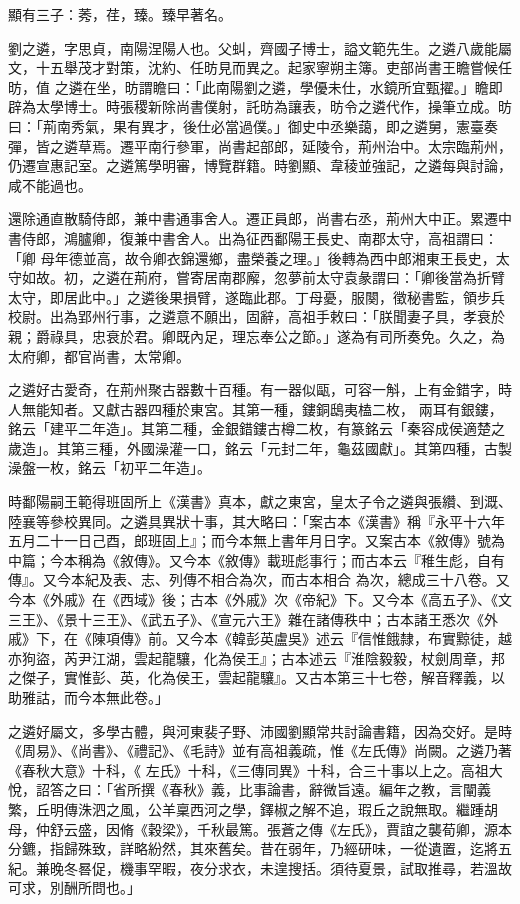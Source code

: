 \begin{pinyinscope}
 顯有三子：莠，荏，臻。臻早著名。



 劉之遴，字思貞，南陽涅陽人也。父虯，齊國子博士，謚文範先生。之遴八歲能屬文，十五舉茂才對策，沈約、任昉見而異之。起家寧朔主簿。吏部尚書王瞻嘗候任昉，值
 之遴在坐，昉謂瞻曰：「此南陽劉之遴，學優未仕，水鏡所宜甄擢。」瞻即辟為太學博士。時張稷新除尚書僕射，託昉為讓表，昉令之遴代作，操筆立成。昉曰：「荊南秀氣，果有異才，後仕必當過僕。」御史中丞樂藹，即之遴舅，憲臺奏彈，皆之遴草焉。遷平南行參軍，尚書起部郎，延陵令，荊州治中。太宗臨荊州，仍遷宣惠記室。之遴篤學明審，博覽群籍。時劉顯、韋稜並強記，之遴每與討論，咸不能過也。



 還除通直散騎侍郎，兼中書通事舍人。遷正員郎，尚書右丞，荊州大中正。累遷中書侍郎，鴻臚卿，復兼中書舍人。出為征西鄱陽王長史、南郡太守，高祖謂曰：「卿
 母年德並高，故令卿衣錦還鄉，盡榮養之理。」後轉為西中郎湘東王長史，太守如故。初，之遴在荊府，嘗寄居南郡廨，忽夢前太守袁彖謂曰：「卿後當為折臂太守，即居此中。」之遴後果損臂，遂臨此郡。丁母憂，服闋，徵秘書監，領步兵校尉。出為郢州行事，之遴意不願出，固辭，高祖手敕曰：「朕聞妻子具，孝衰於親；爵祿具，忠衰於君。卿既內足，理忘奉公之節。」遂為有司所奏免。久之，為太府卿，都官尚書，太常卿。



 之遴好古愛奇，在荊州聚古器數十百種。有一器似甌，可容一斛，上有金錯字，時人無能知者。又獻古器四種於東宮。其第一種，鏤銅鴟夷榼二枚，
 兩耳有銀鏤，銘云「建平二年造」。其第二種，金銀錯鏤古樽二枚，有篆銘云「秦容成侯適楚之歲造」。其第三種，外國澡灌一口，銘云「元封二年，龜茲國獻」。其第四種，古製澡盤一枚，銘云「初平二年造」。



 時鄱陽嗣王範得班固所上《漢書》真本，獻之東宮，皇太子令之遴與張纘、到溉、陸襄等參校異同。之遴具異狀十事，其大略曰：「案古本《漢書》稱『永平十六年五月二十一日己酉，郎班固上』；而今本無上書年月日字。又案古本《敘傳》號為中篇；今本稱為《敘傳》。又今本《敘傳》載班彪事行；而古本云『稚生彪，自有傳』。又今本紀及表、志、列傳不相合為次，而古本相合
 為次，總成三十八卷。又今本《外戚》在《西域》後；古本《外戚》次《帝紀》下。又今本《高五子》、《文三王》、《景十三王》、《武五子》、《宣元六王》雜在諸傳秩中；古本諸王悉次《外戚》下，在《陳項傳》前。又今本《韓彭英盧吳》述云『信惟餓隸，布實黥徒，越亦狗盜，芮尹江湖，雲起龍驤，化為侯王』；古本述云『淮陰毅毅，杖劍周章，邦之傑子，實惟彭、英，化為侯王，雲起龍驤』。又古本第三十七卷，解音釋義，以助雅詁，而今本無此卷。」



 之遴好屬文，多學古體，與河東裴子野、沛國劉顯常共討論書籍，因為交好。是時《周易》、《尚書》、《禮記》、《毛詩》並有高祖義疏，惟《左氏傳》尚闕。之遴乃著《春秋大意》十科，《
 左氏》十科，《三傳同異》十科，合三十事以上之。高祖大悅，詔答之曰：「省所撰《春秋》義，比事論書，辭微旨遠。編年之教，言闡義繁，丘明傳洙泗之風，公羊稟西河之學，鐸椒之解不追，瑕丘之說無取。繼踵胡母，仲舒云盛，因脩《穀梁》，千秋最篤。張蒼之傳《左氏》，賈誼之襲荀卿，源本分鑣，指歸殊致，詳略紛然，其來舊矣。昔在弱年，乃經研味，一從遺置，迄將五紀。兼晚冬晷促，機事罕暇，夜分求衣，未遑搜括。須待夏景，試取推尋，若溫故可求，別酬所問也。」




\end{pinyinscope}
